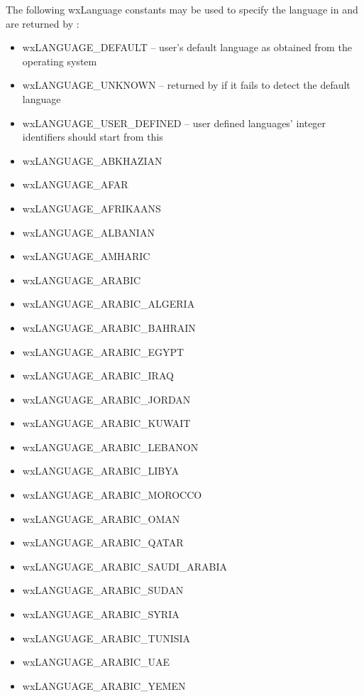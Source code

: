 The following wxLanguage constants may be used to specify the language
in  and are returned by 
:




\begin{itemize}\itemsep=0pt
\item wxLANGUAGE\_DEFAULT -- user's default language as obtained from the operating system 
\item wxLANGUAGE\_UNKNOWN -- returned by 
if it fails to detect the default language 
\item wxLANGUAGE\_USER\_DEFINED -- user defined languages' integer identifiers should start from
this
\item wxLANGUAGE\_ABKHAZIAN
\item wxLANGUAGE\_AFAR
\item wxLANGUAGE\_AFRIKAANS
\item wxLANGUAGE\_ALBANIAN
\item wxLANGUAGE\_AMHARIC
\item wxLANGUAGE\_ARABIC
\item wxLANGUAGE\_ARABIC\_ALGERIA
\item wxLANGUAGE\_ARABIC\_BAHRAIN
\item wxLANGUAGE\_ARABIC\_EGYPT
\item wxLANGUAGE\_ARABIC\_IRAQ
\item wxLANGUAGE\_ARABIC\_JORDAN
\item wxLANGUAGE\_ARABIC\_KUWAIT
\item wxLANGUAGE\_ARABIC\_LEBANON
\item wxLANGUAGE\_ARABIC\_LIBYA
\item wxLANGUAGE\_ARABIC\_MOROCCO
\item wxLANGUAGE\_ARABIC\_OMAN
\item wxLANGUAGE\_ARABIC\_QATAR
\item wxLANGUAGE\_ARABIC\_SAUDI\_ARABIA
\item wxLANGUAGE\_ARABIC\_SUDAN
\item wxLANGUAGE\_ARABIC\_SYRIA
\item wxLANGUAGE\_ARABIC\_TUNISIA
\item wxLANGUAGE\_ARABIC\_UAE
\item wxLANGUAGE\_ARABIC\_YEMEN

\end{itemize}
